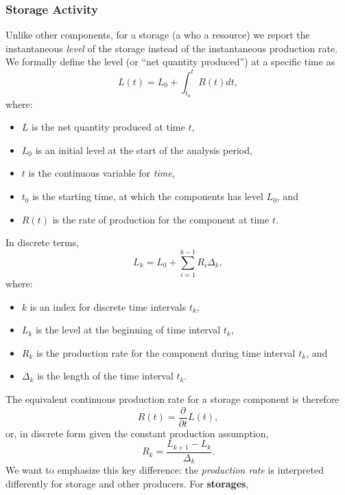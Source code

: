\subsubsection{Storage Activity}
Unlike other components, for a storage (a  who  a resource) we
report the instantaneous \emph{level} of the storage instead of the instantaneous production rate.
We formally define the level (or ``net quantity produced'') at a specific time as
\begin{equation}
  L(t) = L_0 + \int_{t_0}^t R(t) dt,
\end{equation}
where:
\begin{itemize}
  \item $L$ is the net quantity produced at time $t$,
  \item $L_0$ is an initial level at the start of the analysis period,
  \item $t$ is the continuous variable for \emph{time},
  \item $t_0$ is the starting time, at which the components has level $L_0$, and
  \item $R(t)$ is the rate of production for the component at time $t$.
\end{itemize}
In discrete terms,
\begin{equation}
  L_k = L_0 + \sum_{i=1}^{k-1} R_i \Delta_k,
\end{equation}
where:
\begin{itemize}
  \item $k$ is an index for discrete time intervals $t_k$,
  \item $L_k$ is the level at the beginning of time interval $t_k$,
  \item $R_k$ is the production rate for the component during time interval $t_k$, and
  \item $\Delta_k$ is the length of the time interval $t_k$.
\end{itemize}
The equivalent continuous production rate for a storage component is therefore
\begin{equation}
  R(t) = \frac{\partial}{\partial t} L(t),
\end{equation}
or, in discrete form given the constant production assumption,
\begin{equation}
  R_k = \frac{L_{k+1} - L_k}{\Delta_k}.
\end{equation}
We want to emphasize this key difference: the \emph{production rate} is interpreted differently for
storage and other producers. For \textbf{storages},
